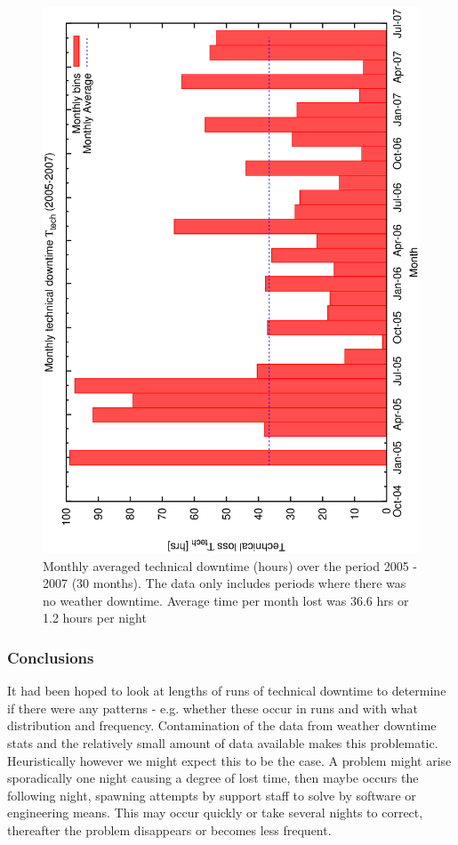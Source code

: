 \begin{figure}[htbp]
  \begin{center}
    \includegraphics[scale=0.4, angle=-90]{figures/ecs/monthly_tech_stats.eps}
  \end{center}   
  \caption[Monthly averaged technical downtime.]
{Monthly averaged technical downtime (hours) over the period 2005 - 2007 (30 months). The data only includes periods where there was no weather downtime. Average time per month lost was 36.6 hrs or 1.2 hours per night}
  \label{fig:monthly_tech_stats}
\end{figure}


\subsubsection{Conclusions}
It had been hoped to look at lengths of runs of technical downtime to determine if there were any patterns - e.g. whether these occur in runs and with what distribution and frequency. Contamination of the data from weather downtime stats and the relatively small amount of data available makes this problematic. Heuristically however we might expect this to be the case. A problem might arise sporadically one night causing a degree of lost time, then maybe occurs the following night, spawning attempts by support staff to solve by software or engineering means. This may occur quickly or take several nights to correct, thereafter the problem disappears or becomes less frequent.


